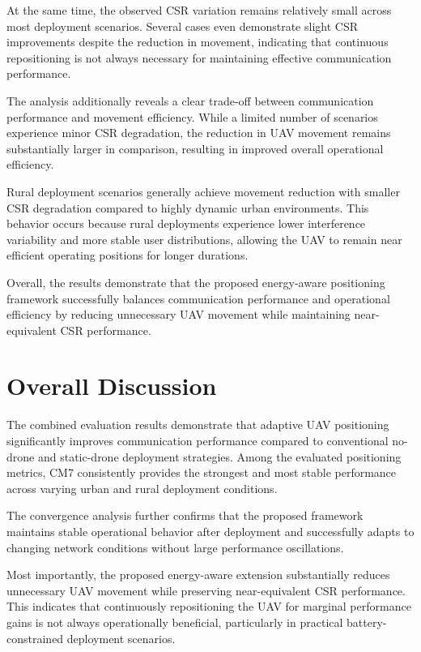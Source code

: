 \documentclass[12pt]{report}
\begin{document}
At the same time, the observed CSR variation remains relatively small across most deployment scenarios. Several cases even demonstrate slight CSR improvements despite the reduction in movement, indicating that continuous repositioning is not always necessary for maintaining effective communication performance.

The analysis additionally reveals a clear trade-off between communication performance and movement efficiency. While a limited number of scenarios experience minor CSR degradation, the reduction in UAV movement remains substantially larger in comparison, resulting in improved overall operational efficiency.

Rural deployment scenarios generally achieve movement reduction with smaller CSR degradation compared to highly dynamic urban environments. This behavior occurs because rural deployments experience lower interference variability and more stable user distributions, allowing the UAV to remain near efficient operating positions for longer durations.

Overall, the results demonstrate that the proposed energy-aware positioning framework successfully balances communication performance and operational efficiency by reducing unnecessary UAV movement while maintaining near-equivalent CSR performance.

\section{Overall Discussion}

The combined evaluation results demonstrate that adaptive UAV positioning significantly improves communication performance compared to conventional no-drone and static-drone deployment strategies. Among the evaluated positioning metrics, CM7 consistently provides the strongest and most stable performance across varying urban and rural deployment conditions.

The convergence analysis further confirms that the proposed framework maintains stable operational behavior after deployment and successfully adapts to changing network conditions without large performance oscillations.

Most importantly, the proposed energy-aware extension substantially reduces unnecessary UAV movement while preserving near-equivalent CSR performance. This indicates that continuously repositioning the UAV for marginal performance gains is not always operationally beneficial, particularly in practical battery-constrained deployment scenarios.
\end{document}
